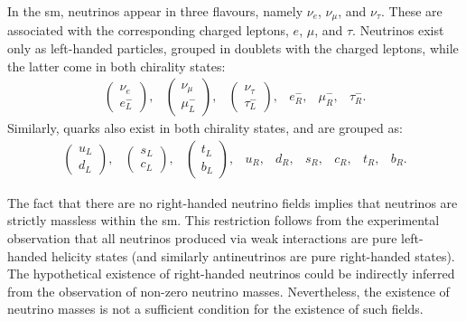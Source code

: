 In the \gls{sm}, neutrinos appear in three flavours, namely $\nu_{e}$, $\nu_{\mu}$, and $\nu_{\tau}$. These are associated with the corresponding charged leptons, $e$, $\mu$, and $\tau$. Neutrinos exist only as left-handed particles, grouped in doublets with the charged leptons, while the latter come in both chirality states:
\begin{equation}
	\begin{array}{cccccc}
		\begin{pmatrix}\nu_{e}\\e^{-}_{L}\end{pmatrix},&\begin{pmatrix}\nu_{\mu}\\\mu^{-}_{L}\end{pmatrix},&\begin{pmatrix}\nu_{\tau}\\\tau^{-}_{L}\end{pmatrix},&e^{-}_{R},&\mu^{-}_{R},&\tau^{-}_{R}.
	\end{array}
\end{equation}
Similarly, quarks also exist in both chirality states, and are grouped as:
\begin{equation}
	\begin{array}{ccccccccc}
		\begin{pmatrix}u_{L}\\d_{L}\end{pmatrix},&\begin{pmatrix}s_{L}\\c_{L}\end{pmatrix},&\begin{pmatrix}t_{L}\\b_{L}\end{pmatrix},&u_{R},&d_{R},&s_{R},&c_{R},&t_{R},&b_{R}.
	\end{array}
\end{equation}

The fact that there are no right-handed neutrino fields implies that neutrinos are strictly massless within the \gls{sm}. This restriction follows from the experimental observation that all neutrinos produced via weak interactions are pure left-handed helicity states \cite{Goldhaber1958} (and similarly antineutrinos are pure right-handed states). The hypothetical existence of right-handed neutrinos could be indirectly inferred from the observation of non-zero neutrino masses. Nevertheless, the existence of neutrino masses is not a sufficient condition for the existence of such fields.

